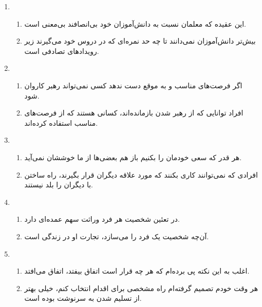 \documentclass[a4paper,10pt]{article}
\begin{document}
\begin{enumerate}
\hdashline
 \item \begin{enumerate}
        \item این عقیده که معلمان نسبت به دانش‌آموزان خود بی‌انصافند بی‌معنی است.
	\item بیش‌تر دانش‌آموزان نمی‌دانند تا چه حد نمره‌ای که در دروس خود می‌گیرند زیر رویدادهای تصادفی است.
       \end{enumerate}

\hdashline

 \item \begin{enumerate}
        \item اگر فرصت‌های مناسب و به موقع دست ندهد کسی نمی‌تواند رهبر کاروان شود.
	\item افراد توانایی که از رهبر شدن باز‌مانده‌اند، کسانی هستند که از فرصت‌های مناسب استفاده کرده‌اند.
       \end{enumerate}

\hdashline

 \item \begin{enumerate}
        \item هر قدر که سعی خودمان را بکنیم باز هم بعضی‌ها از ما خوششان نمی‌آید.
	\item افرادی که نمی‌توانند کاری بکنند که مورد علاقه دیگران قرار بگیرند، راه ساختن با دیگران را بلد نیستند.
       \end{enumerate}

\hdashline

 \item \begin{enumerate}
        \item در تعئین شخصیت هر فرد وراثت سهم عمده‌ای دارد.
	\item آن‌چه شخصیت یک فرد را می‌سازد، تجارت او در زندگی است.
       \end{enumerate}

\hdashline

 \item \begin{enumerate}
        \item اغلب به این نکته پی برده‌ام که هر چه قرار است اتفاق بیفتد، اتفاق می‌افتد.
	\item هر وقت خودم تصمیم گرفته‌ام راه مشخصی برای اقدام انتخاب کنم، خیلی بهتر از تسلیم شدن به سرنوشت بوده است.
       \end{enumerate}

\hdashline


\end{enumerate}
\end{document}
